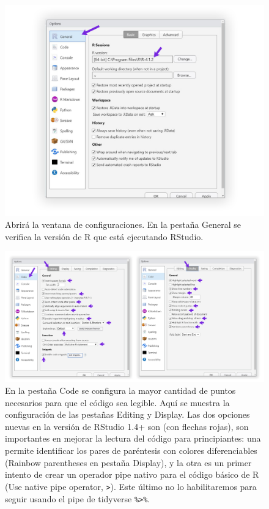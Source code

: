 \documentclass[
]{article}
\theoremstyle{definition}
\theoremstyle{definition}
\theoremstyle{definition}
\theoremstyle{definition}
\theoremstyle{remark}
\begin{document}
\begin{figure}

{\centering \includegraphics[width=1\linewidth]{figs/screenshots/configRStudio-2} 

}

\caption{Abrirá la ventana de configuraciones. En la pestaña General se verifica la versión de R que está ejecutando RStudio.}\label{fig:figura3}
\end{figure}



\begin{figure}

{\centering \includegraphics[width=1\linewidth]{figs/screenshots/configRStudio-3} 

}

\caption{En la pestaña Code se configura la mayor cantidad de puntos necesarios para que el código sea legible. Aquí se muestra la configuración de las pestañas Editing y Display. Las dos opciones nuevas en la versión de RStudio 1.4+ son (con flechas rojas), son importantes en mejorar la lectura del código para principiantes: una permite identificar los pares de paréntesis con colores diferenciables (Rainbow parentheses en pestaña Display), y la otra es un primer intento de crear un operador pipe nativo para el código básico de R (Use native pipe operator, \texttt{\textbar{}\textgreater{}}). Este último no lo habilitaremos para seguir usando el pipe de tidyverse \texttt{\%\textgreater{}\%}.}\label{fig:figura4}
\end{figure}
\end{document}
